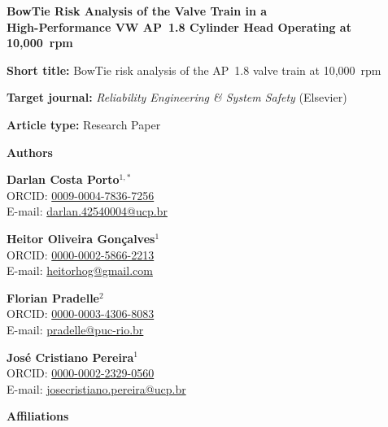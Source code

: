 \documentclass[11pt,a4paper]{article}
\begin{document}
\begin{center}
{\Large\bfseries BowTie Risk Analysis of the Valve Train in a\\
High-Performance VW AP~1.8 Cylinder Head Operating at 10{,}000~rpm\par}
\end{center}

\bigskip

\noindent\textbf{Short title:} BowTie risk analysis of the AP~1.8
valve train at 10{,}000~rpm

\bigskip

\noindent\textbf{Target journal:} \emph{Reliability Engineering \&
System Safety} (Elsevier)

\bigskip

\noindent\textbf{Article type:} Research Paper

\bigskip\bigskip

\noindent\textbf{Authors}

\medskip

\noindent\textbf{Darlan Costa Porto}$^{1,*}$\\
ORCID: \href{https://orcid.org/0009-0004-7836-7256}{0009-0004-7836-7256}\\
E-mail: \href{mailto:darlan.42540004@ucp.br}{darlan.42540004@ucp.br}

\medskip

\noindent\textbf{Heitor Oliveira Gon\c{c}alves}$^{1}$\\
ORCID: \href{https://orcid.org/0000-0002-5866-2213}{0000-0002-5866-2213}\\
E-mail: \href{mailto:heitorhog@gmail.com}{heitorhog@gmail.com}

\medskip

\noindent\textbf{Florian Pradelle}$^{2}$\\
ORCID: \href{https://orcid.org/0000-0003-4306-8083}{0000-0003-4306-8083}\\
E-mail: \href{mailto:pradelle@puc-rio.br}{pradelle@puc-rio.br}

\medskip

\noindent\textbf{Jos\'e Cristiano Pereira}$^{1}$\\
ORCID: \href{https://orcid.org/0000-0002-2329-0560}{0000-0002-2329-0560}\\
E-mail: \href{mailto:josecristiano.pereira@ucp.br}{josecristiano.pereira@ucp.br}

\bigskip\bigskip

\noindent\textbf{Affiliations}

\medskip
\end{document}
